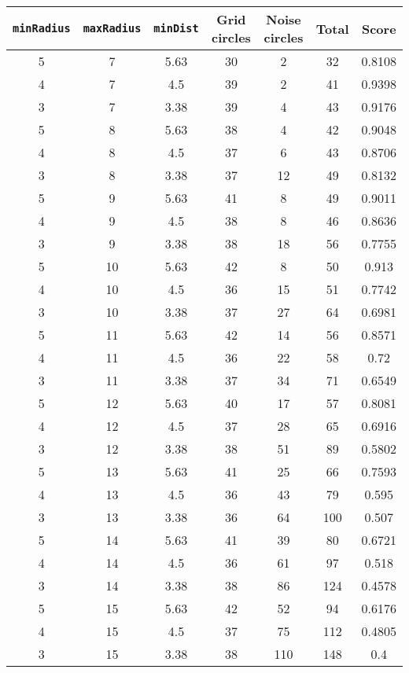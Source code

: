 \documentclass[letterpaper, 12pt]{article}
\begin{document}
\begin{longtable}{|c|c|c|c|c|c|c|}
\hline
\textbf{\texttt{minRadius}} & \textbf{\texttt{maxRadius}} & \textbf{\texttt{minDist}} & \textbf{Grid circles} & \textbf{Noise circles} & \textbf{Total} & \textbf{Score} \\
\hline
5 & 7 & 5.63 & 30 & 2 & 32 & 0.8108 \\
\hline
4 & 7 & 4.5 & 39 & 2 & 41 & 0.9398 \\
\hline
3 & 7 & 3.38 & 39 & 4 & 43 & 0.9176 \\
\hline
5 & 8 & 5.63 & 38 & 4 & 42 & 0.9048 \\
\hline
4 & 8 & 4.5 & 37 & 6 & 43 & 0.8706 \\
\hline
3 & 8 & 3.38 & 37 & 12 & 49 & 0.8132 \\
\hline
5 & 9 & 5.63 & 41 & 8 & 49 & 0.9011 \\
\hline
4 & 9 & 4.5 & 38 & 8 & 46 & 0.8636 \\
\hline
3 & 9 & 3.38 & 38 & 18 & 56 & 0.7755 \\
\hline
5 & 10 & 5.63 & 42 & 8 & 50 & 0.913 \\
\hline
4 & 10 & 4.5 & 36 & 15 & 51 & 0.7742 \\
\hline
3 & 10 & 3.38 & 37 & 27 & 64 & 0.6981 \\
\hline
5 & 11 & 5.63 & 42 & 14 & 56 & 0.8571 \\
\hline
4 & 11 & 4.5 & 36 & 22 & 58 & 0.72 \\
\hline
3 & 11 & 3.38 & 37 & 34 & 71 & 0.6549 \\
\hline
5 & 12 & 5.63 & 40 & 17 & 57 & 0.8081 \\
\hline
4 & 12 & 4.5 & 37 & 28 & 65 & 0.6916 \\
\hline
3 & 12 & 3.38 & 38 & 51 & 89 & 0.5802 \\
\hline
5 & 13 & 5.63 & 41 & 25 & 66 & 0.7593 \\
\hline
4 & 13 & 4.5 & 36 & 43 & 79 & 0.595 \\
\hline
3 & 13 & 3.38 & 36 & 64 & 100 & 0.507 \\
\hline
5 & 14 & 5.63 & 41 & 39 & 80 & 0.6721 \\
\hline
4 & 14 & 4.5 & 36 & 61 & 97 & 0.518 \\
\hline
3 & 14 & 3.38 & 38 & 86 & 124 & 0.4578 \\
\hline
5 & 15 & 5.63 & 42 & 52 & 94 & 0.6176 \\
\hline
4 & 15 & 4.5 & 37 & 75 & 112 & 0.4805 \\
\hline
3 & 15 & 3.38 & 38 & 110 & 148 & 0.4 \\

\end{longtable}
\end{document}
